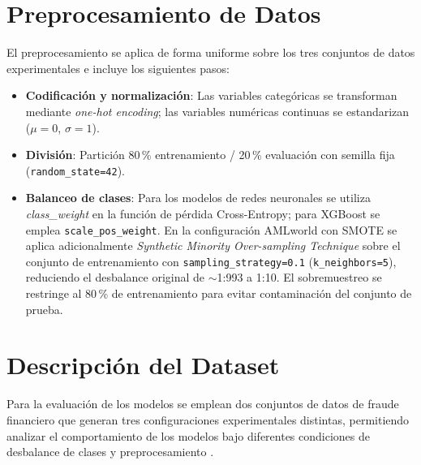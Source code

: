 \section{Preprocesamiento de Datos}

El preprocesamiento se aplica de forma uniforme sobre los tres conjuntos de datos experimentales e incluye los siguientes pasos:

\begin{itemize}
    \item \textbf{Codificación y normalización}: Las variables categóricas se transforman mediante \textit{one-hot encoding}; las variables numéricas continuas se estandarizan ($\mu=0$, $\sigma=1$).

    \item \textbf{División}: Partición 80\,\% entrenamiento / 20\,\% evaluación con semilla fija (\texttt{random\_state=42}).

    \item \textbf{Balanceo de clases}: Para los modelos de redes neuronales se utiliza \textit{class\_weight} en la función de pérdida Cross-Entropy; para XGBoost se emplea \texttt{scale\_pos\_weight}. En la configuración AMLworld con SMOTE se aplica adicionalmente \textit{Synthetic Minority Over-sampling Technique} \cite{chawla2002smote} sobre el conjunto de entrenamiento con \texttt{sampling\_strategy=0.1} (\texttt{k\_neighbors=5}), reduciendo el desbalance original de $\sim$1:993 a 1:10. El sobremuestreo se restringe al 80\,\% de entrenamiento para evitar contaminación del conjunto de prueba.
\end{itemize}

\section{Descripción del Dataset}

Para la evaluación de los modelos se emplean dos conjuntos de datos de fraude financiero que generan tres configuraciones experimentales distintas, permitiendo analizar el comportamiento de los modelos bajo diferentes condiciones de desbalance de clases y preprocesamiento \cite{HernandezAros2024}.

